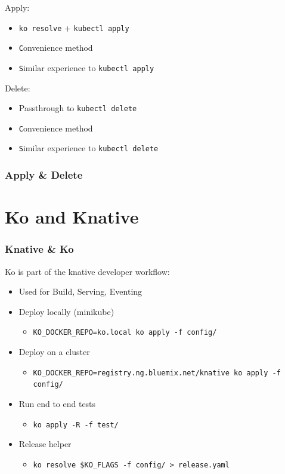 \documentclass[aspectratio=169,11pt,hyperref={colorlinks=true}]{beamer}
\begin{document}
\begin{2columnsframe}
\begin{2columnsframe}%
  {
    Apply:
    \begin{itemize}
      \item \texttt{ko resolve} + \texttt{kubectl apply}
      \item \texttt Convenience method
      \item \texttt Similar experience to \texttt{kubectl apply}
    \end{itemize}
  }
  {
    Delete:
    \begin{itemize}
      \item Passthrough to \texttt{kubectl delete}
      \item \texttt Convenience method
      \item \texttt Similar experience to \texttt{kubectl delete}
    \end{itemize}
  }
  \frametitle{Apply \& Delete}
\end{2columnsframe}

\section{Ko and Knative}

\begin{grayframe}
  \frametitle{Knative \& Ko}
  Ko is part of the knative developer workflow:
  \begin{itemize}
    \item Used for Build, Serving, Eventing
    \item Deploy locally (minikube)
    \begin{itemize}
      \item \texttt{KO\_DOCKER\_REPO=ko.local ko apply -f config/}
    \end{itemize}
    \item Deploy on a cluster
    \begin{itemize}
      \item \texttt{KO\_DOCKER\_REPO=registry.ng.bluemix.net/knative ko apply -f config/}
    \end{itemize}
    \item Run end to end tests
    \begin{itemize}
      \item \texttt{ko apply -R -f test/}
    \end{itemize}
    \item Release helper
    \begin{itemize}
      \item \texttt{ko resolve \${KO\_FLAGS} -f config/ > release.yaml}
    \end{itemize}
  \end{itemize}
\end{grayframe}


\end{2columnsframe}
\end{document}
